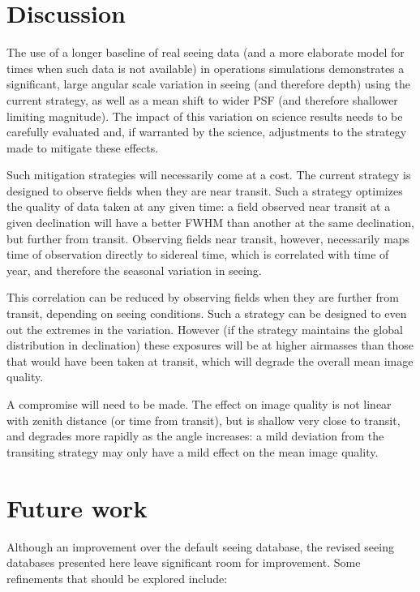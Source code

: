 \documentclass[DM,authoryear,toc]{lsstdoc}
\begin{document}

\section{Discussion}
\label{sec:discussion}

The use of a longer baseline of real seeing data (and a more elaborate
model for times when such data is not available) in operations
simulations demonstrates a significant, large angular scale variation
in seeing (and therefore depth) using the current strategy, as well as
a mean shift to wider PSF (and therefore shallower limiting
magnitude). The impact of this variation on science results needs to
be carefully evaluated and, if warranted by the science, adjustments
to the strategy made to mitigate these effects.

Such mitigation strategies will necessarily come at a cost. The
current strategy is designed to observe fields when they are near
transit. Such a strategy optimizes the quality of data taken at any
given time: a field observed near transit at a given declination will
have a better FWHM than another at the same declination, but further
from transit. Observing fields near transit, however, necessarily maps
time of observation directly to sidereal time, which is correlated
with time of year, and therefore the seasonal variation in seeing.

This correlation can be reduced by observing fields when they are
further from transit, depending on seeing conditions. Such a strategy
can be designed to even out the extremes in the variation. However (if
the strategy maintains the global distribution in declination) these
exposures will be at higher airmasses than those that would have been
taken at transit, which will degrade the overall mean image quality.

A compromise will need to be made. The effect on image quality is not
linear with zenith distance (or time from transit), but is shallow
very close to transit, and degrades more rapidly as the angle
increases: a mild deviation from the transiting strategy may only have
a mild effect on the mean image quality.

\section{Future work}
\label{sec:future}

Although an improvement over the default seeing database, the revised
seeing databases presented here leave significant room for
improvement. Some refinements that should be explored include:
\end{document}
